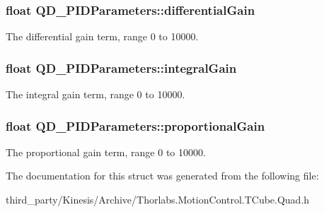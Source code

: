 \subsubsection[{\texorpdfstring{differential\+Gain}{differentialGain}}]{\setlength{\rightskip}{0pt plus 5cm}float Q\+D\+\_\+\+P\+I\+D\+Parameters\+::differential\+Gain}\hypertarget{struct_q_d___p_i_d_parameters_a6c68bd1f2567bbacfae56ecdd3ef6fd7}{}\label{struct_q_d___p_i_d_parameters_a6c68bd1f2567bbacfae56ecdd3ef6fd7}


The differential gain term, range 0 to 10000. 

\subsubsection[{\texorpdfstring{integral\+Gain}{integralGain}}]{\setlength{\rightskip}{0pt plus 5cm}float Q\+D\+\_\+\+P\+I\+D\+Parameters\+::integral\+Gain}\hypertarget{struct_q_d___p_i_d_parameters_a32844a65e26149b27db9b84a16d135e0}{}\label{struct_q_d___p_i_d_parameters_a32844a65e26149b27db9b84a16d135e0}


The integral gain term, range 0 to 10000. 

\subsubsection[{\texorpdfstring{proportional\+Gain}{proportionalGain}}]{\setlength{\rightskip}{0pt plus 5cm}float Q\+D\+\_\+\+P\+I\+D\+Parameters\+::proportional\+Gain}\hypertarget{struct_q_d___p_i_d_parameters_a3916d7b784411f22cbaecce06c486d9a}{}\label{struct_q_d___p_i_d_parameters_a3916d7b784411f22cbaecce06c486d9a}


The proportional gain term, range 0 to 10000. 



The documentation for this struct was generated from the following file\+:\begin{DoxyCompactItemize}
\item 
third\+\_\+party/\+Kinesis/\+Archive/Thorlabs.\+Motion\+Control.\+T\+Cube.\+Quad.\+h\end{DoxyCompactItemize}
